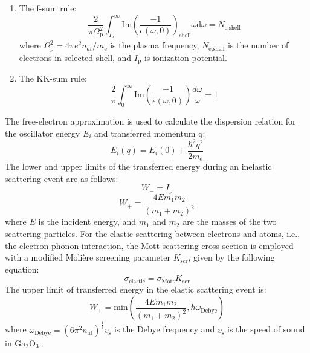 \documentclass[aip,graphicx,amsmath,amssymb]{revtex4-1}
\newcommand{\ga}{$\text{Ga}_2\text{O}_3$}
\begin{document}
\begin{enumerate} 
\item The f-sum rule: 
\begin{equation} 
\frac{2}{\pi 
\Omega_{\text{p}}^{2}}\int_{I_{\text{p}}}^{\infty}\mathrm{Im}(\frac{-1}{\epsilon(\omega,0)})_{\text{shell}}\omega 
\mathrm{d}\omega = N_{\text{e,shell}} 
\end{equation} 
where $\Omega_{\text{p}}^{2}=4\pi e^{2}n_{at}/m_{\text{e}}$ is the plasma frequency, 
$N_{\text{e,shell}}$ is the number of electrons in selected shell, and $I_{\text{p}}$ is 
ionization potential. 
\item The KK-sum rule: 
\begin{equation} 
\frac{2}{\pi}\int_{0}^{\infty} 
\mathrm{Im}(\frac{-1}{\epsilon(\omega,0)})\frac{d\omega}{\omega} = 1 
\end{equation} 
\end{enumerate} 
The free-electron approximation is used to calculate the dispersion relation 
for the oscillator energy $E_{i}$ and transferred momentum q: 
\begin{equation} 
E_{i}(q) = E_{i}(0) + \frac{\hbar^{2}q^{2}}{2m_{\text{e}}} 
\end{equation} 
The lower and upper limits of the transferred energy during an inelastic 
scattering event are as follows: 
\begin{equation} 
W_{-} = I_{\text{p}} 
\end{equation} 
\begin{equation} 
W_{+} = \frac{4Em_{1}m_{2}}{(m_{1}+m_{2})^{2}} 
\end{equation} 
where $E$ is the incident energy, and $m_{1}$ and $m_{2}$ are the masses of the 
two scattering particles. 
For the elastic scattering between electrons and atoms, i.e., the 
electron-phonon interaction, the Mott scattering cross section is employed with 
a modified Moli\`ere screening parameter $K_{\text{scr}}$,\cite{Jenkins2012} given 
by the following equation: 
\begin{equation} 
\sigma_{\text{elastic}} = \sigma_{\text{Mott}}K_{\text{scr}} 
\end{equation} 
The upper limit of transferred energy in the elastic scattering event is: 
\begin{equation} 
W_{+} = \mathrm{min}(\frac{4Em_{1}m_{2}}{(m_{1}+m_{2})^{2}}, 
\hbar\omega_{\text{Debye}}) 
\end{equation} 
where $\omega_{\text{Debye}}=(6\pi^{2}n_{\text{at}})^{\frac{1}{3}}v_{\text{s}}$ is the Debye 
frequency and $v_{\text{s}}$ is the speed of sound in \ga. 
 
\end{document}
